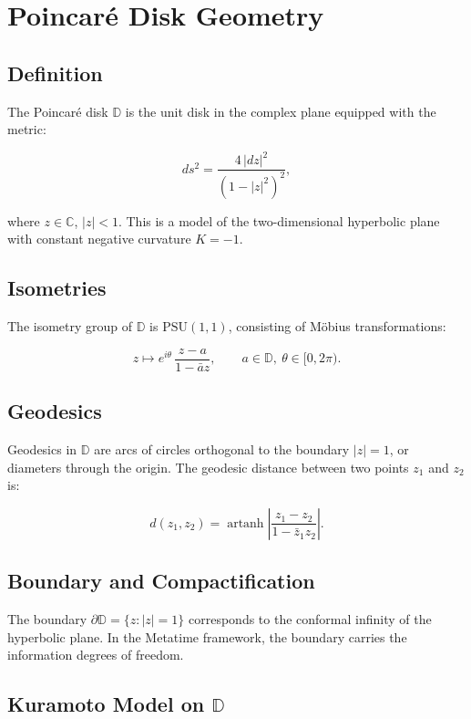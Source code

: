\chapter{Poincar\'{e} Disk Geometry}
\label{app:poincare}

\section{Definition}

The Poincar\'{e} disk $\mathbb{D}$ is the unit disk in the complex plane
equipped with the metric:

\[
ds^2 = \frac{4\,|dz|^2}{(1 - |z|^2)^2},
\]

where $z \in \mathbb{C}$, $|z| < 1$.  This is a model of the
two-dimensional hyperbolic plane with constant negative curvature
$K = -1$.

\section{Isometries}

The isometry group of $\mathbb{D}$ is $\text{PSU}(1,1)$, consisting of
M\"{o}bius transformations:

\[
z \mapsto e^{i\theta}\,\frac{z - a}{1 - \bar{a}z},
\qquad a \in \mathbb{D},\ \theta \in [0,2\pi).
\]

\section{Geodesics}

Geodesics in $\mathbb{D}$ are arcs of circles orthogonal to the boundary
$|z| = 1$, or diameters through the origin.  The geodesic distance between
two points $z_1$ and $z_2$ is:

\[
d(z_1, z_2) = \operatorname{artanh}\left|
\frac{z_1 - z_2}{1 - \bar{z}_1 z_2}
\right|.
\]

\section{Boundary and Compactification}

The boundary $\partial\mathbb{D} = \{z : |z| = 1\}$ corresponds to the
conformal infinity of the hyperbolic plane.  In the Metatime framework,
the boundary carries the information degrees of freedom.

\section{Kuramoto Model on $\mathbb{D}$}

